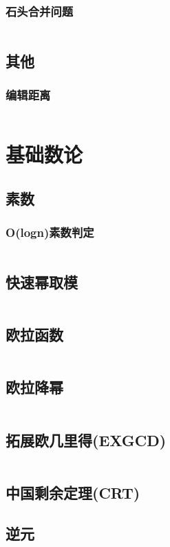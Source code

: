 \documentclass[a4paper,9pt]{article}
\begin{document}
\subsubsection{石头合并问题}
\inputminted[]{c++}{Template/DynamicProgramming/Inteval-dp.cpp}
\subsection{其他}
\subsubsection{编辑距离}
\inputminted[]{c++}{Template/DynamicProgramming/LevenshteinDistance.cpp}
\section{基础数论}
\subsection{素数}
\subsubsection{O(logn)素数判定}
\inputminted[]{c++}{Template/Math/checkPrime.cpp}
\subsection{快速幂取模}
\inputminted[]{c++}{Template/Math/PowMod.cpp}
\subsection{欧拉函数}
\inputminted[]{c++}{Template/Math/Euler.cpp}
\subsection{欧拉降幂}
\inputminted[]{c++}{Template/Math/EulerPower.cpp}
\subsection{拓展欧几里得(EXGCD)}
\inputminted[]{c++}{Template/Math/exgcd.cpp}
\subsection{中国剩余定理(CRT)}
\subsection{逆元}
\inputminted[]{c++}{Template/Math/Inverse.cpp}
\end{document}
